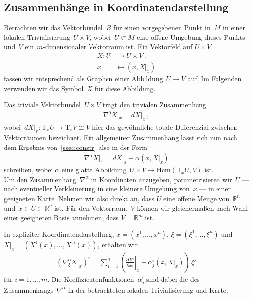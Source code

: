 \documentclass[10pt,a4paper]{article}
\newcommand{\mydef}[1]{\textls{#1}}
\begin{document}
\subsection{Zusammenhänge in Koordinatendarstellung}
\label{ssec:coords}

Betrachten wir das Vektorbündel~$B$ für einen vorgegebenen Punkt in~$M$ in einer lokalen Trivialisierung~$U\times V$, wobei~$U\subset M$ eine offene Umgebung dieses Punkts und~$V$ ein~$m$-dimensionaler Vektorraum ist.
Ein Vektorfeld auf $U\times V$
\begin{align*}
X: U &\rightarrow U \times V
\ ,\nonumber\\
x &\mapsto (x, X|_x)
\end{align*}
fassen wir entsprechend als Graphen einer Abbildung~$U\rightarrow V$ auf.
Im Folgenden verwenden wir das Symbol~$X$ für diese Abbildung.

Das triviale Vektorbündel~$U\times V$ trägt den trivialen Zusammenhang
\begin{align*}
\nabla^0 X|_x = dX|_x
\ ,
\end{align*}
wobei~$dX|_x:\mathrm{T}_xU\rightarrow \mathrm{T}_xV \cong V$ hier das gewöhnliche totale Differenzial zwischen Vektorräumen bezeichnet.
Ein allgemeiner Zusammenhang lässt sich nun nach dem Ergebnis von~\ref{ssec:constr} also in der Form
\begin{align*}
\nabla^\alpha X|_x = dX|_x + \alpha(x, X|_x)
\end{align*}
schreiben, wobei $\alpha$ eine glatte Abbildung~$U \times V\rightarrow \mathrm{Hom}(\mathrm{T}_xU, V)$ ist.\\

Um den Zusammenhang~$\nabla^\alpha$ in Koordinaten anzugeben, parametrisieren wir~$U$ --- nach eventueller Verkleinerung in eine kleinere Umgebung von~$x$ --- in einer geeigneten Karte.
Nehmen wir also direkt an, dass $U$ eine offene Menge von~$\mathbb{R}^n$ und~$x\in U\subset\mathbb{R}^n$ ist.
Für den Vektorraum~$V$ können wir gleichermaßen nach Wahl einer geeigneten Basis annehmen, dass $V=\mathbb{R}^m$ ist.


In expliziter Koordinatendarstellung, $x=(x^1, ..., x^n)$, $\xi=(\xi^1, ..., \xi^n)$ und $X|_x= (X^1(x), ..., X^m(x))$, erhalten wir
\begin{align}
\label{eq:connection_coords}
\left(\nabla^\alpha_\xi X|_x\right)^i
= \sum_{j=1}^n 
\left(
\left.
\frac{\partial X^i}{\partial x^j}
\right|_x
+ \alpha^i_j(x, X|_x)
\right)\,\xi^j
\end{align}
für $i=1, ...,m$.
Die Koeffizienten\-funktionen~$\alpha^i_j$ sind dabei die \mydef{Christoffel-Symbole} des Zusammenhangs~$\nabla^\alpha$ in der betrachteten lokalen Trivialisierung und Karte.
\end{document}
